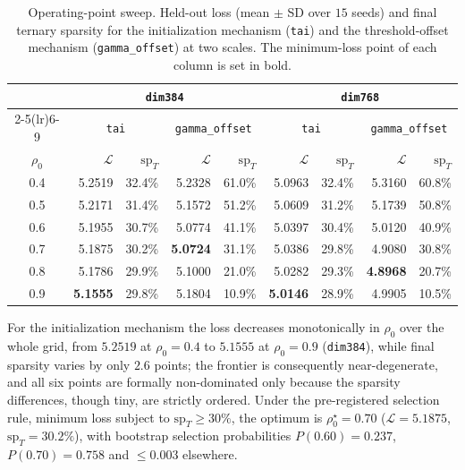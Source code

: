 \documentclass[final,5p,times,twocolumn]{elsarticle}
\theoremstyle{remark}
\newcommand{\rhoz}{\rho_{0}}
\begin{document}
\begin{table}[t]
\centering
\small
\caption{Operating-point sweep. Held-out loss (mean $\pm$ SD over $15$ seeds)
and final ternary sparsity for the initialization mechanism (\texttt{tai}) and
the threshold-offset mechanism (\texttt{gamma\_offset}) at two scales. The
minimum-loss point of each column is set in bold.}
\label{tab:sweep}
\begin{tabular}{@{}crrrrrrrr@{}}
\toprule
& \multicolumn{4}{c}{\texttt{dim384}} & \multicolumn{4}{c}{\texttt{dim768}} \\
\cmidrule(lr){2-5}\cmidrule(lr){6-9}
& \multicolumn{2}{c}{\texttt{tai}} & \multicolumn{2}{c}{\texttt{gamma\_offset}}
& \multicolumn{2}{c}{\texttt{tai}} & \multicolumn{2}{c}{\texttt{gamma\_offset}} \\
$\rhoz$ & $\mathcal{L}$ & $\mathrm{sp}_T$ & $\mathcal{L}$ & $\mathrm{sp}_T$
& $\mathcal{L}$ & $\mathrm{sp}_T$ & $\mathcal{L}$ & $\mathrm{sp}_T$ \\
\midrule
0.4 & 5.2519 & 32.4\% & 5.2328 & 61.0\% & 5.0963 & 32.4\% & 5.3160 & 60.8\% \\
0.5 & 5.2171 & 31.4\% & 5.1572 & 51.2\% & 5.0609 & 31.2\% & 5.1739 & 50.8\% \\
0.6 & 5.1955 & 30.7\% & 5.0774 & 41.1\% & 5.0397 & 30.4\% & 5.0120 & 40.9\% \\
0.7 & 5.1875 & 30.2\% & \textbf{5.0724} & 31.1\% & 5.0386 & 29.8\% & 4.9080 & 30.8\% \\
0.8 & 5.1786 & 29.9\% & 5.1000 & 21.0\% & 5.0282 & 29.3\% & \textbf{4.8968} & 20.7\% \\
0.9 & \textbf{5.1555} & 29.8\% & 5.1804 & 10.9\% & \textbf{5.0146} & 28.9\% & 4.9905 & 10.5\% \\
\bottomrule
\end{tabular}
\end{table}

For the initialization mechanism the loss decreases monotonically in $\rhoz$
over the whole grid, from $5.2519$ at $\rhoz = 0.4$ to $5.1555$ at
$\rhoz = 0.9$ (\texttt{dim384}), while final sparsity varies by only $2.6$
points; the frontier is consequently near-degenerate, and all six points are
formally non-dominated only because the sparsity differences, though tiny, are
strictly ordered. Under the pre-registered selection rule, minimum loss
subject to $\mathrm{sp}_T \geq 30\%$, the optimum is
$\rhoz^\star = 0.70$ ($\mathcal{L} = 5.1875$, $\mathrm{sp}_T = 30.2\%$), with
bootstrap selection probabilities $P(0.60) = 0.237$, $P(0.70) = 0.758$ and
$\leq 0.003$ elsewhere.
\end{document}
